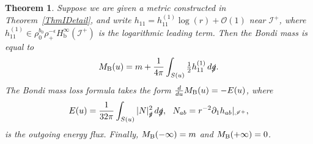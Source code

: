 \documentclass[reqno,11pt,letterpaper]{amsart}
\numberwithin{equation}{section}
\numberwithin{figure}{section}
\newtheorem{thm}{Theorem}[section]
\theoremstyle{definition}
\theoremstyle{remark}
\newcommand{\mc}{\mathcal}
\newcommand{\cO}{\mc O}
\newcommand{\ms}{\mathscr}
\newcommand{\scri}{\ms I}
\newcommand{\slg}{\slashed{g}{}}
\newcommand{\eps}{\epsilon}
\newcommand{\pa}{\partial}
\newcommand{\bop}{{\mathrm{b}}}
\newcommand{\half}{\tfrac{1}{2}}
\newcommand{\Hb}{H_{\bop}}
\newcommand{\usref}[1]{{\upshape\ref{#1}}}
\begin{document}
\begin{thm}
\label{ThmIBondi}
  Suppose we are given a metric constructed in Theorem~\usref{ThmIDetail}, and write $h_{1 1}=h_{1 1}^{(1)}\log(r)+\cO(1)$ near $\scri^+$, where $h_{1 1}^{(1)}\in\rho_0^{b_0}\rho_+^{-\eps}\Hb^\infty(\scri^+)$ is the logarithmic leading term. Then the Bondi mass is equal to
  \begin{equation}
  \label{EqIBondi}
    M_{\rm B}(u) = m + \frac{1}{4\pi}\int_{S(u)} \half h_{1 1}^{(1)}\,d\slg.
  \end{equation}
  The Bondi mass loss formula takes the form $\frac{d}{d u}M_{\rm B}(u)=-E(u)$, where
  \[
    E(u) = \frac{1}{32\pi}\int_{S(u)} |N|_{\slg}^2\,d\slg,\ \ N_{a b}=r^{-2}\pa_1 h_{a b}|_{\scri^+},
  \]
  is the outgoing energy flux. Finally, $M_{\rm B}(-\infty)=m$ and $M_{\rm B}(+\infty)=0$.
\end{thm}
\end{document}
